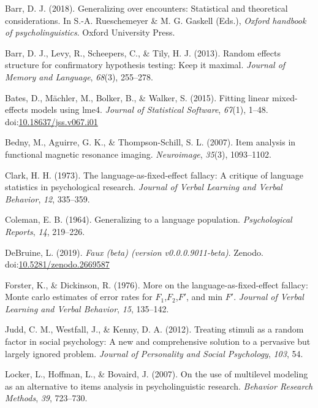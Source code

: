 \documentclass[doc,floatsintext]{apa6}
\begin{document}
\hypertarget{ref-barr_2018}{}
Barr, D. J. (2018). Generalizing over encounters: Statistical and
theoretical considerations. In S.-A. Rueschemeyer \& M. G. Gaskell
(Eds.), \emph{Oxford handbook of psycholinguistics}. Oxford University
Press.

\hypertarget{ref-barr_et_al_2013}{}
Barr, D. J., Levy, R., Scheepers, C., \& Tily, H. J. (2013). Random
effects structure for confirmatory hypothesis testing: Keep it maximal.
\emph{Journal of Memory and Language}, \emph{68}(3), 255--278.

\hypertarget{ref-R-lme4}{}
Bates, D., Mächler, M., Bolker, B., \& Walker, S. (2015). Fitting linear
mixed-effects models using lme4. \emph{Journal of Statistical Software},
\emph{67}(1), 1--48.
doi:\href{https://doi.org/10.18637/jss.v067.i01}{10.18637/jss.v067.i01}

\hypertarget{ref-bedny_aguirre_thompson-schill_2007}{}
Bedny, M., Aguirre, G. K., \& Thompson-Schill, S. L. (2007). Item
analysis in functional magnetic resonance imaging. \emph{Neuroimage},
\emph{35}(3), 1093--1102.

\hypertarget{ref-clark_1973}{}
Clark, H. H. (1973). The language-as-fixed-effect fallacy: A critique of
language statistics in psychological research. \emph{Journal of Verbal
Learning and Verbal Behavior}, \emph{12}, 335--359.

\hypertarget{ref-coleman_1964}{}
Coleman, E. B. (1964). Generalizing to a language population.
\emph{Psychological Reports}, \emph{14}, 219--226.

\hypertarget{ref-R-faux}{}
DeBruine, L. (2019). \emph{Faux (beta) (version v0.0.0.9011-beta)}.
Zenodo.
doi:\href{https://doi.org/10.5281/zenodo.2669587}{10.5281/zenodo.2669587}

\hypertarget{ref-forster_dickinson_1976}{}
Forster, K., \& Dickinson, R. (1976). More on the
language-as-fixed-effect fallacy: Monte carlo estimates of error rates
for \(F_1\),\(F_2\),\(F'\), and min \(F'\). \emph{Journal of Verbal
Learning and Verbal Behavior}, \emph{15}, 135--142.

\hypertarget{ref-judd_westfall_kenny_2012}{}
Judd, C. M., Westfall, J., \& Kenny, D. A. (2012). Treating stimuli as a
random factor in social psychology: A new and comprehensive solution to
a pervasive but largely ignored problem. \emph{Journal of Personality
and Social Psychology}, \emph{103}, 54.

\hypertarget{ref-locker_hoffman_bovaird_2007}{}
Locker, L., Hoffman, L., \& Bovaird, J. (2007). On the use of multilevel
modeling as an alternative to items analysis in psycholinguistic
research. \emph{Behavior Research Methods}, \emph{39}, 723--730.
\end{document}
